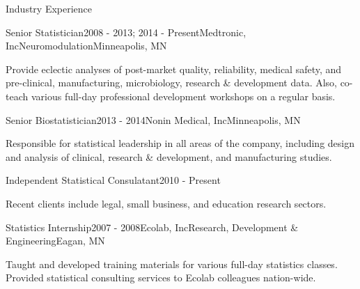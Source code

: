 \documentclass{resume} %
\begin{document}
\begin{rSection}{Industry Experience}

\begin{rSubsection}{Senior Statistician}{2008 - 2013; 2014 - Present}{Medtronic, Inc\textemdash  Neuromodulation}{Minneapolis, MN}
\item[] Provide eclectic analyses of post-market quality, reliability, medical safety, and pre-clinical, manufacturing, microbiology, research \& development data.  Also, co-teach various full-day professional development workshops on a regular basis.
\end{rSubsection}


\begin{rSubsection}{Senior Biostatistician}{2013 - 2014}{Nonin Medical, Inc}{Minneapolis, MN}
	\item[] Responsible for statistical leadership in all areas of the company, including design and analysis of clinical, research \& development, and manufacturing studies. 
\end{rSubsection}


\begin{rSubsection}{Independent Statistical Consulatant}{2010 - Present}{}{}
	\item[] Recent clients include legal, small business, and education research sectors.
\end{rSubsection}


\begin{rSubsection}{Statistics Internship}{2007 - 2008}{Ecolab, Inc\textemdash Research, Development \& Engineering}{Eagan, MN}
	\item[] Taught and developed training materials for various full-day statistics classes. Provided statistical consulting services to Ecolab colleagues nation-wide.
\end{rSubsection}


\end{rSection}

\clearpage
\end{document}

